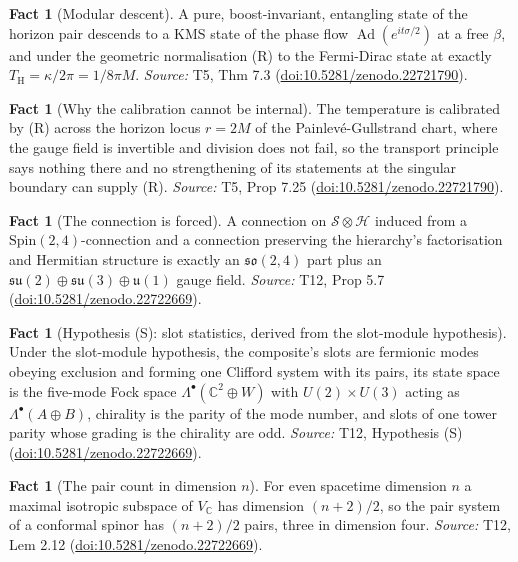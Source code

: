 \documentclass[11pt]{article}
\theoremstyle{definition}
\newtheorem{fact}[theorem]{Fact}
\theoremstyle{plain}
\providecommand{\C}{}\renewcommand{\C}{\mathbb{C}}
\providecommand{\TH}{}\renewcommand{\TH}{T_{\mathrm{H}}}
\providecommand{\so}{}\renewcommand{\so}{\mathfrak{so}}
\providecommand{\su}{}\renewcommand{\su}{\mathfrak{su}}
\providecommand{\uu}{}\renewcommand{\uu}{\mathfrak{u}}
\begin{document}
\begin{fact}[Modular descent]\label{c:singularity.modular-descent}
A pure, boost-invariant, entangling state of the horizon pair descends to a KMS state of the phase flow $\operatorname{Ad}(e^{it\sigma/2})$ at a free $\beta$, and under the geometric normalisation (R) to the Fermi-Dirac state at exactly $\TH = \kappa/2\pi = 1/8\pi M$.
\emph{Source:} T5, Thm 7.3 (\href{https://doi.org/10.5281/zenodo.22721790}{doi:10.5281/zenodo.22721790}).
\end{fact}

\begin{fact}[Why the calibration cannot be internal]\label{c:singularity.why-calibration-cannot-be-internal}
The temperature is calibrated by (R) across the horizon locus $r = 2M$ of the Painlev\'e-Gullstrand chart, where the gauge field is invertible and division does not fail, so the transport principle says nothing there and no strengthening of its statements at the singular boundary can supply (R).
\emph{Source:} T5, Prop 7.25 (\href{https://doi.org/10.5281/zenodo.22721790}{doi:10.5281/zenodo.22721790}).
\end{fact}

\begin{fact}[The connection is forced]\label{c:standard-model.connection-forced}
A connection on $\mathcal{S} \otimes \mathcal{H}$ induced from a $\mathrm{Spin}(2,4)$-connection and a connection preserving the hierarchy's factorisation and Hermitian structure is exactly an $\so(2,4)$ part plus an $\su(2) \oplus \su(3) \oplus \uu(1)$ gauge field.
\emph{Source:} T12, Prop 5.7 (\href{https://doi.org/10.5281/zenodo.22722669}{doi:10.5281/zenodo.22722669}).
\end{fact}

\begin{fact}[Hypothesis (S): slot statistics, derived from the slot-module hypothesis]\label{c:standard-model.hyp-s-slot-statistics}
Under the slot-module hypothesis, the composite's slots are fermionic modes obeying exclusion and forming one Clifford system with its pairs, its state space is the five-mode Fock space $\Lambda^{\bullet}(\C^{2} \oplus W)$ with $U(2) \times U(3)$ acting as $\Lambda^{\bullet}(A \oplus B)$, chirality is the parity of the mode number, and slots of one tower parity whose grading is the chirality are odd.
\emph{Source:} T12, Hypothesis (S) (\href{https://doi.org/10.5281/zenodo.22722669}{doi:10.5281/zenodo.22722669}).
\end{fact}

\begin{fact}[The pair count in dimension $n$]\label{c:standard-model.pair-count-dimension}
For even spacetime dimension $n$ a maximal isotropic subspace of $V_{\C}$ has dimension $(n+2)/2$, so the pair system of a conformal spinor has $(n+2)/2$ pairs, three in dimension four.
\emph{Source:} T12, Lem 2.12 (\href{https://doi.org/10.5281/zenodo.22722669}{doi:10.5281/zenodo.22722669}).
\end{fact}
\end{document}
